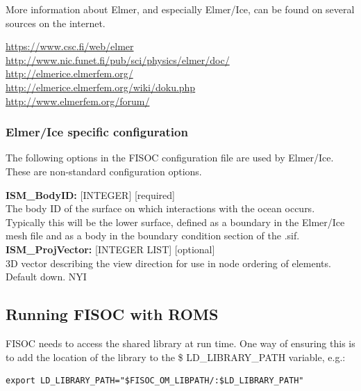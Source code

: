 \documentclass[11pt]{article}
\begin{document}
More information about Elmer, and especially Elmer/Ice, can be found on several sources 
on the internet.

\begin{flushleft}
\url{https://www.csc.fi/web/elmer}\\
\url{http://www.nic.funet.fi/pub/sci/physics/elmer/doc/}\\
\url{http://elmerice.elmerfem.org/}\\
\url{http://elmerice.elmerfem.org/wiki/doku.php}\\
\url{http://www.elmerfem.org/forum/}\\
\end{flushleft}



\subsubsection{Elmer/Ice specific configuration}

The following options in the FISOC configuration file are used by Elmer/Ice.  These 
are non-standard configuration options.

\begin{flushleft}
\textbf{ISM\_BodyID:} [INTEGER] [required]                               \\
The body ID of the surface on which interactions with the ocean occurs.  
Typically this will be the lower surface, defined as a boundary in the   
Elmer/Ice mesh file and as a body in the boundary condition section of   
the .sif.                                                                \\
\vspace{6pt}
\textbf{ISM\_ProjVector:} [INTEGER LIST] [optional]                      \\
3D vector describing the view direction for use in node ordering of      
elements.  Default down.  NYI                                            \\
\vspace{6pt}
\end{flushleft}





\subsection{Running FISOC with ROMS}
\label{sec:runningROMS}

FISOC needs to access the shared library at run time.  One way of ensuring this 
is to add the location of the library to the \$ LD\_LIBRARY\_PATH variable, e.g.:
\begin{lstlisting}
export LD_LIBRARY_PATH="$FISOC_OM_LIBPATH/:$LD_LIBRARY_PATH"
\end{lstlisting}
\end{document}
